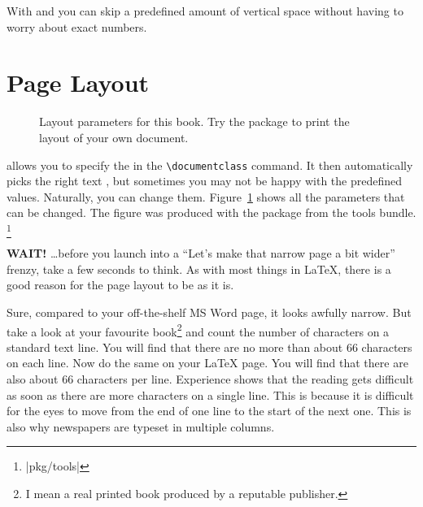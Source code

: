 With  and  you can skip a predefined amount of
vertical space without having to worry about exact numbers.


\section{Page Layout}

\begin{figure}[!hp]
\begin{center}
\makeatletter\@mylayout\makeatother
\end{center}
\vspace*{1.8cm}
\caption[Layout parameters for this book.]{Layout parameters for this book. Try the  package to print the layout of your own document.}
\label{fig:layout}
\end{figure}
\LaTeXe{} allows you to specify the  in the
\verb|\documentclass| command. It then automatically picks the right
text , but sometimes you may not be happy with
the predefined values. Naturally, you can change them.
\thispagestyle{fancyplain}
Figure~\ref{fig:layout} shows all the parameters that can be changed.
The figure was produced with the  package from the tools bundle.%
\footnote{\CTANref|pkg/tools|}

\textbf{WAIT!} \ldots before you launch into a ``Let's make that
narrow page a bit wider'' frenzy, take a few seconds to think. As with
most things in \LaTeX, there is a good reason for the page layout to
be as it is.

Sure, compared to your off-the-shelf MS Word page, it looks awfully
narrow. But take a look at your favourite book\footnote{I mean a real
  printed book produced by a reputable publisher.} and count the number
of characters on a standard text line. You will find that there are no
more than about 66 characters on each line. Now do the same on your
\LaTeX{} page. You will find that there are also about 66 characters
per line.  Experience shows that the reading gets difficult as soon as
there are more characters on a single line. This is because it is
difficult for the eyes to move from the end of one line to the start of the next one.
This is also why newspapers are typeset in multiple columns.

